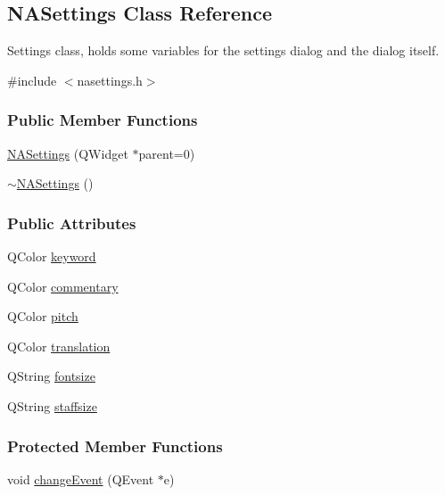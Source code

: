 \hypertarget{class_n_a_settings}{\subsection{\-N\-A\-Settings \-Class \-Reference}
\label{class_n_a_settings}
}


\-Settings class, holds some variables for the settings dialog and the dialog itself.  




{\ttfamily \#include $<$nasettings.\-h$>$}

\subsubsection*{\-Public \-Member \-Functions}
\begin{DoxyCompactItemize}
\item 
\hyperlink{class_n_a_settings_a800fd08e1ce3ebb92cfaa3ab06383018}{\-N\-A\-Settings} (\-Q\-Widget $\ast$parent=0)
\item 
\hyperlink{class_n_a_settings_a7311dbd0e2504c6168f8d2baee63ddd2}{$\sim$\-N\-A\-Settings} ()
\end{DoxyCompactItemize}
\subsubsection*{\-Public \-Attributes}
\begin{DoxyCompactItemize}
\item 
\-Q\-Color \hyperlink{class_n_a_settings_a350ad35ee9f5f7b281dc737c856c60b6}{keyword}
\item 
\-Q\-Color \hyperlink{class_n_a_settings_a5664018dde5193a8f5e16c52fb0caf48}{commentary}
\item 
\-Q\-Color \hyperlink{class_n_a_settings_af6987962f1746780b2f33ffb370498c0}{pitch}
\item 
\-Q\-Color \hyperlink{class_n_a_settings_a87da2bfd4a25e0eafde61fb41c9a4931}{translation}
\item 
\-Q\-String \hyperlink{class_n_a_settings_ada0b15c317a1902885d9719a24a071b6}{fontsize}
\item 
\-Q\-String \hyperlink{class_n_a_settings_aa0fd38ef4993f6982c3147642912572a}{staffsize}
\end{DoxyCompactItemize}
\subsubsection*{\-Protected \-Member \-Functions}
\begin{DoxyCompactItemize}
\item 
void \hyperlink{class_n_a_settings_a4b5e6d70064378bd3a5d5a9789322208}{change\-Event} (\-Q\-Event $\ast$e)
\end{DoxyCompactItemize}


